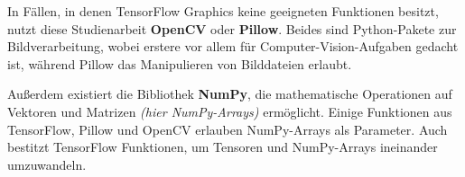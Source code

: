 In Fällen, in denen TensorFlow Graphics keine geeigneten Funktionen besitzt, nutzt diese Studienarbeit \textbf{OpenCV} oder \textbf{Pillow}. Beides sind Python-Pakete zur Bildverarbeitung, wobei erstere vor allem für Computer-Vision-Aufgaben gedacht ist, während Pillow das Manipulieren von Bilddateien erlaubt. \cite{opencv} \cite{pillow}

Außerdem existiert die Bibliothek \textbf{NumPy}, die mathematische Operationen auf Vektoren und Matrizen \emph{(hier NumPy-Arrays)} ermöglicht. Einige Funktionen aus TensorFlow, Pillow und OpenCV erlauben NumPy-Arrays als Parameter. Auch bestitzt TensorFlow Funktionen, um Tensoren und NumPy-Arrays ineinander umzuwandeln. \cite{numpy}
